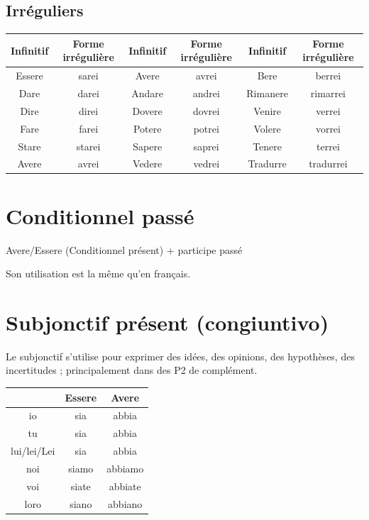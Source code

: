 \documentclass[12pt, openany]{report}
\begin{document}
\subsection{Irréguliers}
\begin{center}
    \begin{tabular}{c|c||c|c||c|c}
        Infinitif & Forme irrégulière & Infinitif & Forme irrégulière & Infinitif & Forme irrégulière\\ \hline 
        Essere & sarei & Avere & avrei & Bere & berrei\\
        Dare & darei & Andare & andrei & Rimanere & rimarrei\\
        Dire & direi & Dovere & dovrei & Venire & verrei\\
        Fare & farei & Potere & potrei & Volere & vorrei\\
        Stare & starei & Sapere & saprei & Tenere & terrei\\
        Avere & avrei & Vedere & vedrei & Tradurre & tradurrei\\
    \end{tabular}
\end{center}
\section{Conditionnel passé}
\begin{center}
    Avere/Essere (Conditionnel présent) + participe passé
\end{center}
Son utilisation est la même qu'en français. 
\section{Subjonctif présent (congiuntivo)}
Le subjonctif s'utilise pour exprimer des idées, des opinions, des hypothèses, des incertitudes ; principalement dans des P2 de complément. 
\begin{center}
    \begin{tabular}{c|c|c}
        & Essere & Avere \\ \hline 
        io & sia & abbia \\
        tu & sia & abbia \\
        lui/lei/Lei & sia & abbia \\
        noi & siamo & abbiamo \\
        voi & siate & abbiate \\
        loro & siano & abbiano
    \end{tabular}
\end{center}
\end{document}
